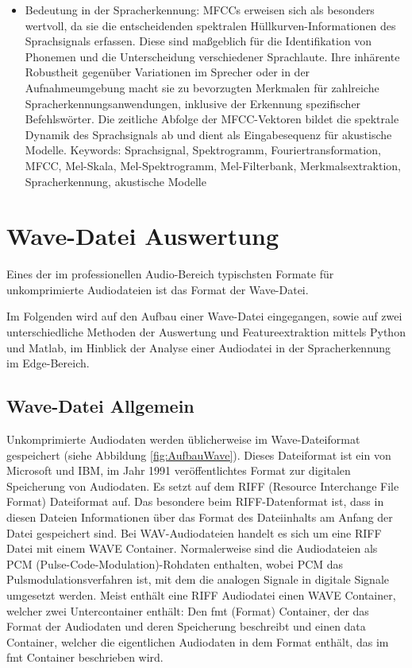 \begin{itemize}
	\item Bedeutung in der Spracherkennung: MFCCs erweisen sich als besonders wertvoll, da sie die entscheidenden spektralen Hüllkurven-Informationen des Sprachsignals erfassen. Diese sind maßgeblich für die Identifikation von Phonemen und die Unterscheidung verschiedener Sprachlaute. Ihre inhärente Robustheit gegenüber Variationen im Sprecher oder in der Aufnahmeumgebung macht sie zu bevorzugten Merkmalen für zahlreiche Spracherkennungsanwendungen, inklusive der Erkennung spezifischer Befehlswörter. Die zeitliche Abfolge der MFCC-Vektoren bildet die spektrale Dynamik des Sprachsignals ab und dient als Eingabesequenz für akustische Modelle.
	Keywords: Sprachsignal, Spektrogramm, Fouriertransformation, MFCC, Mel-Skala, Mel-Spektrogramm, Mel-Filterbank, Merkmalsextraktion, Spracherkennung, akustische Modelle
\end{itemize} \cite{Pfister:2008}



\chapter{Wave-Datei Auswertung} \label{sec:Wave-Datei Auswertung}

Eines der im professionellen Audio-Bereich typischsten Formate für unkomprimierte Audiodateien ist das Format der Wave-Datei.

\bigskip

Im Folgenden wird auf den Aufbau einer Wave-Datei eingegangen, sowie auf zwei unterschiedliche Methoden der Auswertung und Featureextraktion mittels Python und Matlab, im Hinblick der Analyse einer Audiodatei in der Spracherkennung im Edge-Bereich.  

\section{Wave-Datei Allgemein}

Unkomprimierte Audiodaten werden üblicherweise im Wave-Dateiformat gespeichert (siehe Abbildung \ref{fig:AufbauWave}). Dieses Dateiformat ist ein von 
Microsoft und IBM, im Jahr 1991 veröffentlichtes Format zur digitalen Speicherung von Audiodaten.
Es setzt auf dem RIFF (Resource Interchange File Format) Dateiformat auf.
Das besondere beim RIFF-Datenformat ist, dass in diesen Dateien Informationen über das Format des Dateiinhalts 
am Anfang der Datei gespeichert sind.
Bei WAV-Audiodateien handelt es sich um eine RIFF Datei mit einem WAVE Container. 
Normalerweise sind die Audiodateien als  PCM (Pulse-Code-Modulation)-Rohdaten enthalten, wobei PCM das Pulsmodulationsverfahren ist, mit dem die analogen Signale in digitale Signale umgesetzt werden.
Meist enthält eine RIFF Audiodatei einen WAVE Container, welcher zwei Untercontainer enthält:
Den fmt (Format) Container, der das Format der Audiodaten und deren Speicherung beschreibt und 
einen data Container, welcher die eigentlichen Audiodaten in dem Format enthält, das im fmt Container beschrieben wird.

